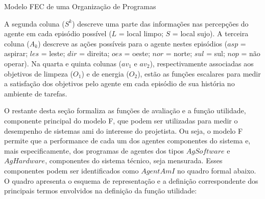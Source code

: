 \begin{section}{Modelo FEC de uma Organização de Programas}
    \begin{table}[h!]   
        \centering
    \end{table}
        
    A segunda coluna ($S^k$) descreve uma parte das informações nas percepções do agente em cada episódio possível ($L$ = local limpo; $S$ = local sujo). A terceira coluna ($A_k$) descreve as ações possíveis para o agente nestes episódios ($asp$ = aspirar; $les$ = leste; $dir$ = direita; $oes$ = oeste; $nor$ = norte; $sul$ = sul; $nop$ = não operar). Na quarta e quinta colunas ($av_1$ e $av_2$), respectivamente associadas aos objetivos de limpeza ($O_1$) e de energia ($O_2$), estão as funções escalares para medir a satisfação dos objetivos pelo agente em cada episódio de sua história no ambiente de tarefas. 
    
    O restante desta seção formaliza as funções de avaliação e a função utilidade, componente principal do modelo F, que podem ser utilizadas para medir o desempenho de sistemas \acrshort{ami} do interesse do projetista. Ou seja, o modelo F permite que a performance de cada um dos agentes componentes do sistema e, mais especificamente, dos programas de agentes dos tipos $AgSoftware$ e $AgHardware$, componentes do sistema técnico, seja mensurada. Esses componentes podem ser identificados como $AgentAmI$ no quadro  formal abaixo. O quadro apresenta o esquema de representação e a definição correspondente dos principais termos envolvidos na definição da função utilidade:
    

\end{section}
